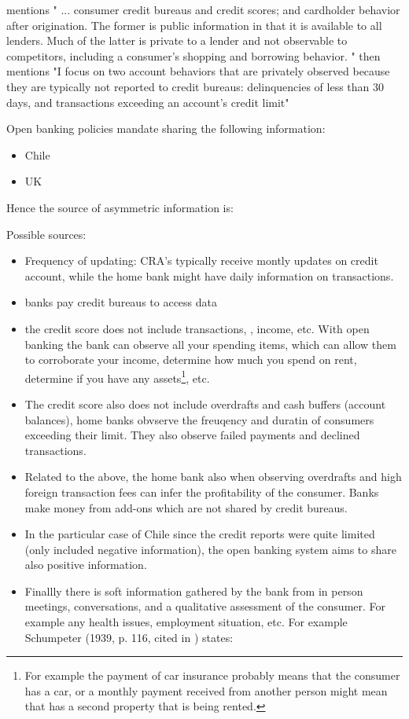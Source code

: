 \documentclass[12pt]{article}
\theoremstyle{plain}
\theoremstyle{plain}
\theoremstyle{definition}  %
\theoremstyle{remark}  %
\begin{document}
\begin{enumerate}
\begin{itemize}
        \textcite{nelson_private_2025} mentions " ... consumer credit bureaus and credit scores; and cardholder behavior after origination. The former is public information in that it is available to all lenders. Much of the latter is private to a lender and not observable to competitors, including a consumer’s shopping and borrowing behavior. " then mentions "I focus on two account behaviors that are privately observed because they are typically not reported to credit bureaus: delinquencies of less than 30 days, and transactions exceeding an account’s credit limit"
    \end{itemize}
    
    Open banking policies mandate sharing the following information: 
    \begin{itemize}
        \item Chile 
        \item UK 
    \end{itemize}

    Hence the source of asymmetric information is: 

    Possible sources:
    \begin{itemize}
        \item Frequency of updating: CRA's typically receive montly updates on credit account, while the home bank might have daily information on transactions.
        \item banks pay credit bureaus to access data 
        \item the credit score does not include transactions, , income, etc.  With open banking the bank can observe all your spending items, which can allow them to corroborate your income, determine how much you spend on rent, determine if you have any assets\footnote{For example the payment of car insurance probably means that the consumer has a car, or a monthly payment received from another person might mean that has a second property that is being rented. }, etc. 
        \item The credit score also does not include overdrafts and cash buffers (account balances), home banks obvserve the freuqency and duratin of consumers exceeding their limit. They also observe failed payments and declined transactions.
        \item Related to the above, the home bank also when observing overdrafts and high foreign transaction fees can infer the profitability of the consumer. Banks make money from add-ons which are not shared by credit bureaus.  
        \item In the particular case of Chile since the credit reports were quite limited (only included negative information), the open banking system aims to share also positive information. 
        \item Finallly there is soft information gathered by the bank from in person meetings, conversations, and a qualitative assessment of the consumer. For example any health issues, employment situation, etc. For example Schumpeter (1939, p. 116, cited in \textcite{diamond_financial_1984}) states: 


\end{itemize}
\end{enumerate}
\end{document}
